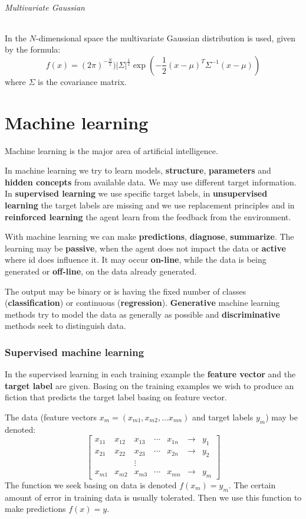 \documentclass[a4paper,10pt]{article}
\begin{document}
\paragraph{Multivariate Gaussian}
In the $N$-dimensional space the multivariate Gaussian distribution is used, given by the formula:
\[ f(x) = (2 \pi)^{-\frac{N}{2}}) | \Sigma |^{\frac{1}{2}} \exp \left(- \frac{1}{2} (x-\mu)^T \Sigma^{-1} (x-\mu) \right) \]
where $\Sigma$ is the covariance matrix.

\part*{Machine learning}

Machine learning is the major area of artificial intelligence.

In machine learning we try to learn models, \textbf{structure}, \textbf{parameters} and \textbf{hidden concepts} from available data. We may use different target information. In \textbf{supervised learning} we use specific target labels, in \textbf{unsupervised learning} the target labels are missing and we use replacement principles and in \textbf{reinforced learning} the agent learn from the feedback from the environment. 

With machine learning we can make \textbf{predictions}, \textbf{diagnose}, \textbf{summarize}. The learning may be \textbf{passive}, when the agent does not impact the data or \textbf{active} where id does influence it. It may occur \textbf{on-line}, while the data is being generated or \textbf{off-line}, on the data already generated.

The output may be binary or is having the fixed number of classes (\textbf{classification}) or continuous (\textbf{regression}). \textbf{Generative} machine learning methods try to model the data as generally as possible and \textbf{discriminative} methods seek to distinguish data.

\section{Supervised machine learning}

In the supervised learning in each training example the \textbf{feature vector} and the \textbf{target label} are given. Basing on the training examples we wish to produce an fiction that predicts the target label basing on feature vector.

The data (feature vectors $x_m=(x_{m1}, x_{m2}, ... x_{mn})$ and target labels $y_m$) may be denoted:
\[
\left[ \begin{array}{ccccccc}
x_{11} & x_{12} & x_{13} & \cdots & x_{1n} & \rightarrow & y_1 \\
x_{21} & x_{22} & x_{23} & \cdots & x_{2n} & \rightarrow & y_2  \\
	&      & \vdots &      &      &             &      \\
x_{m1} & x_{m2} & x_{m3} & \cdots & x_{mn} & \rightarrow & y_m \end{array} \right]
\]
The function we seek basing on data is denoted $f(x_m)=y_m$. The certain amount of error in training data is usually tolerated. Then we use this function to make predictions $f(x)=y$.
\end{document}
